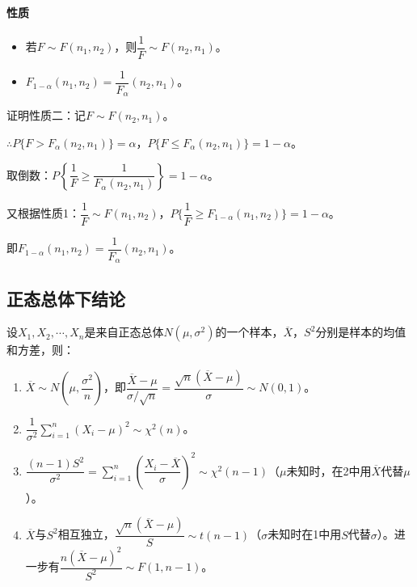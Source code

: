 \documentclass[UTF8, 12pt]{ctexart}
\begin{document}

\paragraph{性质} \leavevmode \medskip

\begin{itemize}
    \item 若$F\sim F(n_1,n_2)$，则$\dfrac{1}{F}\sim F(n_2,n_1)$。
    \item $F_{1-\alpha}(n_1,n_2)=\dfrac{1}{F_\alpha}(n_2,n_1)$。
\end{itemize}

证明性质二：记$F\sim F(n_2,n_1)$。

$\therefore P\{F>F_\alpha(n_2,n_1)\}=\alpha$，$P\{F\leqslant F_\alpha(n_2,n_1)\}=1-\alpha$。

取倒数：$P\left\{\dfrac{1}{F}\geqslant\dfrac{1}{F_\alpha(n_2,n_1)}\right\}=1-\alpha$。

又根据性质1：$\dfrac{1}{F}\sim F(n_1,n_2)$，$P\{\dfrac{1}{F}\geqslant F_{1-\alpha}(n_1,n_2)\}=1-\alpha$。

即$F_{1-\alpha}(n_1,n_2)=\dfrac{1}{F_\alpha}(n_2,n_1)$。

\subsection{正态总体下结论}

设$X_1,X_2,\cdots,X_n$是来自正态总体$N(\mu,\sigma^2)$的一个样本，$\overline{X}$，$S^2$分别是样本的均值和方差，则：

\begin{enumerate}
    \item $\overline{X}\sim N\left(\mu,\dfrac{\sigma^2}{n}\right)$，即$\dfrac{\overline{X}-\mu}{\sigma/\sqrt{n}}=\dfrac{\sqrt{n}(\overline{X}-\mu)}{\sigma}\sim N(0,1)$。
    \item $\dfrac{1}{\sigma^2}\sum\limits_{i=1}^n(X_i-\mu)^2\sim\chi^2(n)$。
    \item $\dfrac{(n-1)S^2}{\sigma^2}=\sum\limits_{i=1}^n\left(\dfrac{X_i-\overline{X}}{\sigma}\right)^2\sim\chi^2(n-1)$（$\mu$未知时，在2中用$\overline{X}$代替$\mu$）。
    \item $\overline{X}$与$S^2$相互独立，$\dfrac{\sqrt{n}(\overline{X}-\mu)}{S}\sim t(n-1)$（$\sigma$未知时在1中用$S$代替$\sigma$）。进一步有$\dfrac{n(\overline{X}-\mu)^2}{S^2}\sim F(1,n-1)$。
\end{enumerate}
\end{document}
